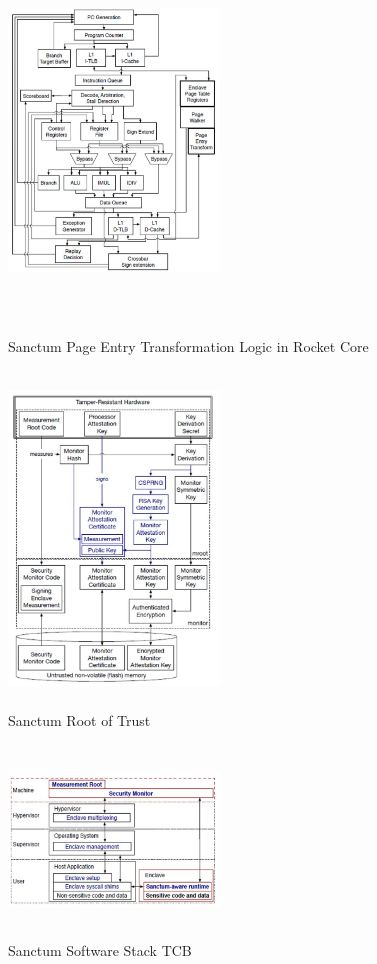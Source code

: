 \documentclass[a4paper,fleqn]{cas-dc}
\begin{document}
\begin{figure}[hbt!]
	\centering
	\includegraphics[width=0.5\textwidth,height=4in]{figs/SanctumPageEntryTransformationLogic.JPG}
	\caption{Sanctum Page Entry Transformation Logic in Rocket Core}
\end{figure}

\begin{figure}[hbt!]
	\centering
	\includegraphics[width=0.5\textwidth,height=3.5in]{figs/SanctumRoT.JPG}
	\caption{Sanctum Root of Trust}
\end{figure}

\begin{figure}[hbt!]
	\centering
	\includegraphics[width=0.5\textwidth,height=2in]{figs/SanctumSwStack.JPG}
	\caption{Sanctum Software Stack TCB}
\end{figure}
\end{document}
